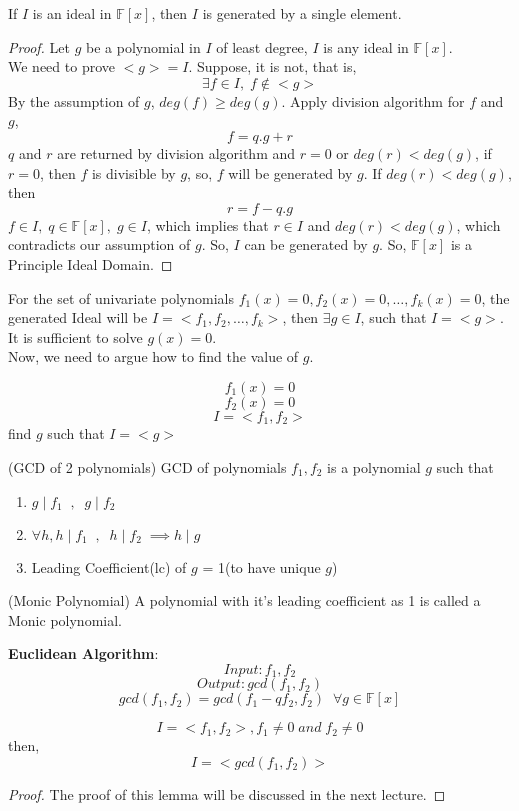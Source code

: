 \begin{theorem}
If $I$ is an ideal in $\mathbb{F}[x]$, then $I$ is generated by a single element.
\end{theorem}
\begin{proof}
Let $g$ be a polynomial in $I$ of least degree, $I$ is any ideal in $\mathbb{F}[x]$.\\
We need to prove $<g>=I$. Suppose, it is not, that is, $$\exists f \in I,\; f \notin <g>$$
By the assumption of $g$, $deg(f)\geq deg(g)$. Apply division algorithm for $f$ and $g$, $$f=q.g+r$$
$q$ and $r$ are returned by division algorithm and $r=0$ or $deg(r)<deg(g)$, if $r=0$, then $f$ is divisible by $g$, so, $f$ will be generated by $g$. If $deg(r)<deg(g)$, then $$r = f-q.g$$ 
$ f\in I,\;q\in\mathbb{F}[x],\;g\in I$, which implies that $r\in I$ and $deg(r)<deg(g)$, which contradicts our assumption of $g$. So, $I$ can be generated by $g$. So, $\mathbb{F}[x]$ is a Principle Ideal Domain.
\end{proof}
For the set of univariate polynomials $f_1(x)=0,f_2(x)=0,\ldots,f_k(x)=0$, the generated Ideal will be $I=<f_1,f_2,\ldots,f_k>$, then $\exists g\in I$, such that $I=<g>$. It is sufficient to solve $g(x)=0$.\\
Now, we need to argue how to find the value of $g$.\\
\begin{problem}
$$f_1(x)=0$$
$$f_2(x)=0$$
$$I=<f_1,f_2>$$
find $g$ such that $I=<g>$
\end{problem}
\begin{definition}(GCD of 2 polynomials)
GCD of polynomials $f_1,f_2$ is a polynomial $g$ such that 
\begin{enumerate}
\item $g\;|\;f_1\;\;,\;\;g\;|\;f_2$
\item $\forall h, h\;|\;f_1\;\;,\;\;h\;|\;f_2\;\implies h\;|\;g$
\item Leading Coefficient(lc) of $g$ = 1(to have unique $g$)
\end{enumerate}
\end{definition}
\begin{definition}(Monic Polynomial)
A polynomial with it's leading coefficient as 1 is called a Monic polynomial.
\end{definition}
\textbf{Euclidean Algorithm}:\\
$$Input:f_1,f_2$$
$$Output: gcd(f_1,f_2)$$
$$gcd(f_1, f_2) = gcd(f_1-qf_2,f_2)\;\;\forall g \in \mathbb{F}[x]$$
\begin{lemma}
$$I = <f_1, f_2>, f_1 \neq 0\;and\;f_2\neq 0$$
then,$$I=<gcd(f_1,f_2)>$$
\end{lemma}
\begin{proof}
The proof of this lemma will be discussed in the next lecture.
\end{proof}
